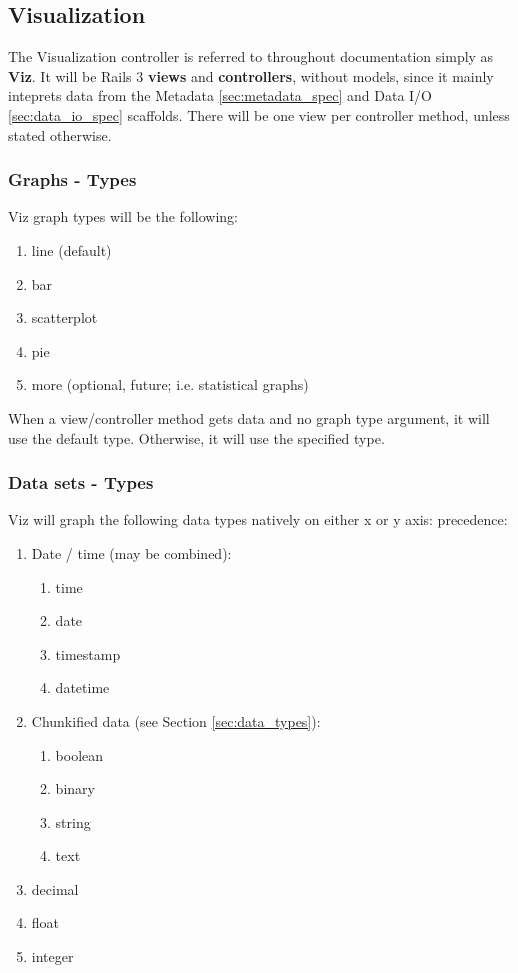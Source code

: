 \subsection{Visualization}
\label{sec:viz_spec}
The Visualization controller is referred to throughout documentation simply as
\textbf{Viz}. It will be Rails 3 \textbf{views} and \textbf{controllers},
without models, since it mainly inteprets data from the Metadata
\ref{sec:metadata_spec} and Data I/O \ref{sec:data_io_spec} scaffolds. There 
will be one view per controller method, unless stated otherwise.

\subsubsection{Graphs - Types}
Viz graph types will be the following:
\begin{enumerate}
	\item line (default)
	\item bar
	\item scatterplot
	\item pie
	\item more (optional, future; i.e. statistical graphs)
\end{enumerate}

When a view/controller method gets data and no graph type argument, it will use
the default type. Otherwise, it will use the specified type.

\subsubsection{Data sets - Types}
Viz will graph the following data types natively on either x or y axis:
precedence:
\begin{enumerate}
	\item Date / time (may be combined):
	\begin{enumerate}
		\item time
		\item date
		\item timestamp
		\item datetime
	\end{enumerate}
	\item Chunkified data (see Section \ref{sec:data_types}):
	\begin{enumerate}
		\item boolean
		\item binary
		\item string
		\item text
	\end{enumerate}
	\item decimal
	\item float
	\item integer
\end{enumerate}

